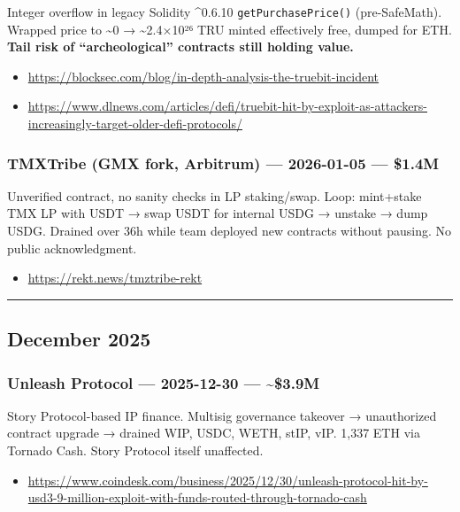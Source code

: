 Integer overflow in legacy Solidity \^{}0.6.10 \texttt{getPurchasePrice()} (pre-SafeMath). Wrapped price to \textasciitilde0 → \textasciitilde2.4×10²⁶ TRU minted effectively free, dumped for ETH. \textbf{Tail risk of ``archeological'' contracts still holding value.}

\begin{itemize}
\tightlist
\item
  \url{https://blocksec.com/blog/in-depth-analysis-the-truebit-incident}
\item
  \url{https://www.dlnews.com/articles/defi/truebit-hit-by-exploit-as-attackers-increasingly-target-older-defi-protocols/}
\end{itemize}

\subsubsection{TMXTribe (GMX fork, Arbitrum) --- 2026-01-05 --- \$1.4M}\label{tmxtribe-gmx-fork-arbitrum-2026-01-05-1.4m}

Unverified contract, no sanity checks in LP staking/swap. Loop: mint+stake TMX LP with USDT → swap USDT for internal USDG → unstake → dump USDG. Drained over 36h while team deployed new contracts without pausing. No public acknowledgment.

\begin{itemize}
\tightlist
\item
  \url{https://rekt.news/tmztribe-rekt}
\end{itemize}

\begin{center}\rule{0.5\linewidth}{0.5pt}\end{center}

\subsection{December 2025}\label{december-2025}

\subsubsection{Unleash Protocol --- 2025-12-30 --- \textasciitilde\$3.9M}\label{unleash-protocol-2025-12-30-3.9m}

Story Protocol-based IP finance. Multisig governance takeover → unauthorized contract upgrade → drained WIP, USDC, WETH, stIP, vIP. 1,337 ETH via Tornado Cash. Story Protocol itself unaffected.

\begin{itemize}
\tightlist
\item
  \url{https://www.coindesk.com/business/2025/12/30/unleash-protocol-hit-by-usd3-9-million-exploit-with-funds-routed-through-tornado-cash}
\end{itemize}

